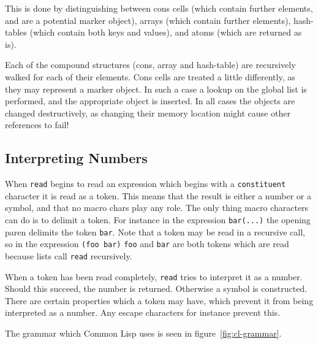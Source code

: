 \documentclass[a4paper,10pt,twoside]{report}
\newcommand{\cl}{Common Lisp}
\newcommand{\fun}[1]{\texttt{#1}}
\newcommand{\Read}{\fun{read}}
\begin{document}
This is done by distinguishing between cons cells (which contain further
elements, and are a potential marker object), arrays (which contain further
elements), hash-tables (which contain both keys and values), and atoms (which
are returned as is).

Each of the compound structures (cons, array and hash-table) are recursively
walked for each of their elements.  Cons cells are treated a little differently,
as they may represent a marker object.  In such a case a lookup on the global
list is performed, and the appropriate object is inserted.  In all cases the
objects are changed destructively, as changing their memory location might cause
other references to fail!

\subsection{Interpreting Numbers}
\label{subsec:interpreting-numbers}

When \Read{} begins to read an expression which begins with a
\texttt{constituent} character it is read as a token.  This means that the
result is either a number or a symbol, and that no macro chars play any role.
The only thing macro characters can do is to delimit a token.  For instance in
the expression \texttt{bar(...)} the opening paren delimits the token
\texttt{bar}.  Note that a token may be read in a recursive call, so in the
expression \texttt{(foo bar)} \texttt{foo} and \texttt{bar} are both tokens
which are read because lists call \Read{} recursively.

When a token has been read completely, \Read{} tries to interpret it as a
number.  Should this succeed, the number is returned.  Otherwise a symbol is
constructed.  There are certain properties which a token may have, which prevent
it from being interpreted as a number.  Any escape characters for instance
prevent this.

The grammar which \cl{} uses is seen in figure~\ref{fig:cl-grammar}.
\end{document}
